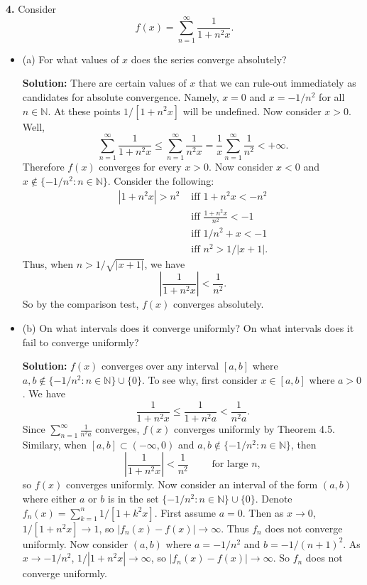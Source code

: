 \documentclass[12pt]{article}
\begin{document}
{\bf 4.} Consider 
\[ f(x) = \sum_{n=1}^{\infty}\frac{1}{1+n^{2}x}. \]
\begin{itemize}[label={},leftmargin=4mm, itemsep=1em, parsep=1em]
  \item (a) For what values of $x$ does the series converge absolutely?

  {\bf Solution:} There are certain values of $x$ that we can rule-out
  immediately as candidates for absolute convergence. Namely, $x = 0$ and $x =
  -1/n^{2}$ for all $n \in \mathbb{N}$. At these points $1 / [1 + n^{2}x]$ will
  be undefined. Now consider $x > 0$. Well,
  \[ \sum_{n=1}^{\infty}\frac{1}{1+n^{2}x} \leq
    \sum_{n=1}^{\infty}\frac{1}{n^{2}x} =
  \frac{1}{x}\sum_{n=1}^{\infty}\frac{1}{n^{2}} < +\infty. \]
  Therefore $f(x)$ converges for every $x > 0$. Now consider $x < 0$ and $x
  \notin \{-1/n^{2} : n \in \mathbb{N}\}$. Consider the following:
  \begin{align*}
    |1 + n^{2}x| > n^{2} & \text{ iff } 1 + n^{2}x < -n^{2} \\
    & \text{ iff } \frac{1+n^{2}x}{n^{2}} < -1 \\
    & \text{ iff } 1/n^{2} + x < -1 \\
    & \text{ iff } n^{2} > 1 / |x + 1|.
  \end{align*}
  Thus, when $n > 1 / \sqrt{|x+1|}$, we have 
  \[ \left| \frac{1}{1+n^{2}x}\right| < \frac{1}{n^{2}}. \]
  So by the comparison test, $f(x)$ converges absolutely.

  \item (b) On what intervals does it converge uniformly? On what intervals does
    it fail to converge uniformly?

  {\bf Solution:} $f(x)$ converges over any interval $[a,b]$ where $a,b \notin
  \{-1/n^{2} : n \in \mathbb{N}\} \cup \{0\}$. To see why, first consider $x \in
  [a,b]$ where $a > 0$. We have 
  \[ \frac{1}{1+n^{2}x} \leq \frac{1}{1+n^{2}a} < \frac{1}{n^{2}a}. \]
  Since $\sum_{n=1}^{\infty}\frac{1}{n^{2}a}$ converges, $f(x)$ converges
  uniformly by Theorem 4.5. Similary, when $[a,b] \subset (-\infty, 0)$ and
  $a,b\notin \{-1/n^{2} : n\in\mathbb{N}\}$, then 
  \[ \left| \frac{1}{1+n^{2}x}\right| < \frac{1}{n^{2}} \qquad \text{ for large
  }n, \]
  so $f(x)$ converges uniformly. Now consider an interval of the form $(a,b)$
  where either $a$ or $b$ is in the set $\{-1/n^{2} : n\in\mathbb{N}\} \cup
  \{0\}$. Denote $f_{n}(x) = \sum_{k=1}^{n}1 / [1+k^{2}x]$. First assume $a =
  0$. Then as $x
  \rightarrow 0$, $1 / [1 + n^{2}x] \rightarrow 1$, so $|f_{n}(x) - f(x)|
  \rightarrow \infty$. Thus $f_{n}$ does not converge uniformly. Now consider
  $(a,b)$ where $a = -1/n^{2}$ and $b = -1/(n+1)^{2}$. As $x \rightarrow
  -1/n^{2}$, $1 / |1+n^{2}x| \rightarrow \infty$, so $|f_{n}(x) - f(x)|
  \rightarrow \infty$. So $f_{n}$ does not converge uniformly.


\end{itemize}
\end{document}
